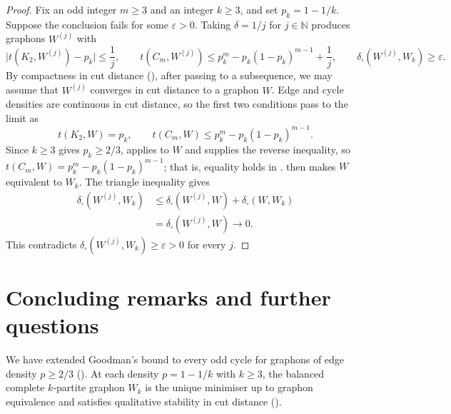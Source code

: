 \documentclass[11pt]{article}
\theoremstyle{remark}
\numberwithin{equation}{section}
\newcommand{\tC}[2]{t(C_{#1},#2)}
\newcommand{\edens}[1]{t(K_{2},#1)}
\begin{document}
\begin{proof}
  Fix an odd integer $m\ge3$ and an integer $k\ge3$, and set $p_k=1-1/k$.
  Suppose the conclusion fails for some $\varepsilon>0$.
  Taking $\delta=1/j$ for $j\in\mathbb N$ produces graphons $W^{(j)}$ with
  \[
    \bigl|\edens{W^{(j)}}-p_k\bigr|\le\frac1j,
    \qquad
    \tC m{W^{(j)}}\le p_k^m-p_k(1-p_k)^{m-1}+\frac1j,
    \qquad
    \delta_\square(W^{(j)},W_k)\ge\varepsilon .
  \]
  By compactness in cut distance (), after passing to a subsequence, we may assume that $W^{(j)}$ converges in cut distance to a graphon $W$.
  Edge and cycle densities are continuous in cut distance, so the first two conditions pass to the limit as
  \[
    \edens W=p_k,
    \qquad
    \tC mW\le p_k^m-p_k(1-p_k)^{m-1}.
  \]
  Since $k\ge3$ gives $p_k\ge2/3$,  applies to $W$ and supplies the reverse inequality, so $\tC mW=p_k^m-p_k(1-p_k)^{m-1}$; that is, equality holds in .
   then makes $W$ equivalent to $W_k$.
  The triangle inequality gives
  \[
    \begin{aligned}
      \delta_\square(W^{(j)},W_k)
      &\le\delta_\square(W^{(j)},W)+\delta_\square(W,W_k)\\
      &=\delta_\square(W^{(j)},W)\longrightarrow0.
    \end{aligned}
  \]
  This contradicts $\delta_\square(W^{(j)},W_k)\ge\varepsilon>0$
  for every $j$.
\end{proof}

\section{Concluding remarks and further questions}
\label{sec:conclusion}

We have extended Goodman's bound to every odd cycle for graphons of edge
density $p\ge2/3$ ().
At each density $p=1-1/k$ with $k\ge3$, the balanced complete
$k$-partite graphon $W_k$ is the unique minimiser up to graphon equivalence
and satisfies qualitative stability in cut distance ().
\end{document}
